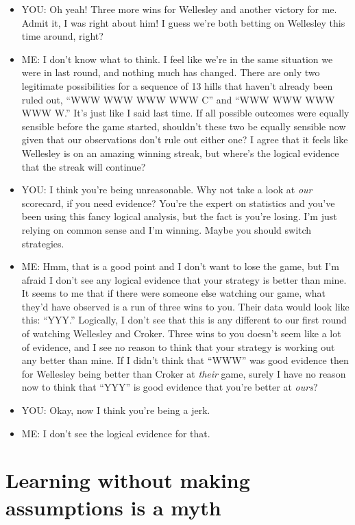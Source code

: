 \documentclass[
]{book}
\providecommand{\tightlist}{%
  \setlength{\itemsep}{0pt}\setlength{\parskip}{0pt}}
\begin{document}
\begin{itemize}
\tightlist
\item
  YOU: Oh yeah! Three more wins for Wellesley and another victory for me. Admit it, I was right about him! I guess we're both betting on Wellesley this time around, right?
\item
  ME: I don't know what to think. I feel like we're in the same situation we were in last round, and nothing much has changed. There are only two legitimate possibilities for a sequence of 13 hills that haven't already been ruled out, ``WWW WWW WWW WWW C'' and ``WWW WWW WWW WWW W.'' It's just like I said last time. If all possible outcomes were equally sensible before the game started, shouldn't these two be equally sensible now given that our observations don't rule out either one? I agree that it feels like Wellesley is on an amazing winning streak, but where's the logical evidence that the streak will continue?
\item
  YOU: I think you're being unreasonable. Why not take a look at \emph{our} scorecard, if you need evidence? You're the expert on statistics and you've been using this fancy logical analysis, but the fact is you're losing. I'm just relying on common sense and I'm winning. Maybe you should switch strategies.
\item
  ME: Hmm, that is a good point and I don't want to lose the game, but I'm afraid I don't see any logical evidence that your strategy is better than mine. It seems to me that if there were someone else watching our game, what they'd have observed is a run of three wins to you. Their data would look like this: ``YYY.'' Logically, I don't see that this is any different to our first round of watching Wellesley and Croker. Three wins to you doesn't seem like a lot of evidence, and I see no reason to think that your strategy is working out any better than mine. If I didn't think that ``WWW'' was good evidence then for Wellesley being better than Croker at \emph{their} game, surely I have no reason now to think that ``YYY'' is good evidence that you're better at \emph{ours}?
\item
  YOU: Okay, now I think you're being a jerk.
\item
  ME: I don't see the logical evidence for that.
\end{itemize}

\hypertarget{learning-without-making-assumptions-is-a-myth}{%
\section*{Learning without making assumptions is a myth}\label{learning-without-making-assumptions-is-a-myth}}
\end{document}
